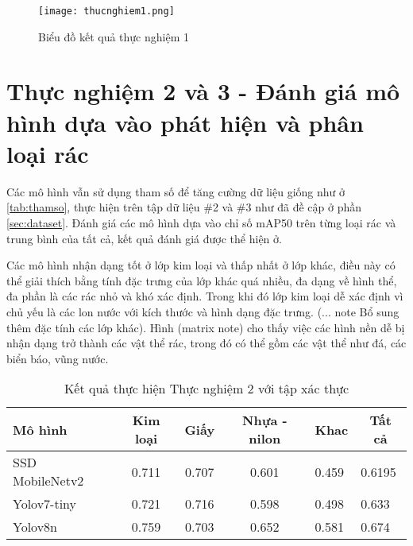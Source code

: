 \documentclass[../the.tex]{subfiles}
\begin{document}
\begin{figure}[H]
    \centering
    \texttt{[image: thucnghiem1.png]}
    \caption{Biểu đồ kết quả thực nghiệm 1}
    \label{fig:thucnghiem1}
\end{figure}

\bigskip

\section{Thực nghiệm 2 và 3 - Đánh giá mô hình dựa vào phát hiện và phân loại rác}
 {\fontsize{13}{12} \selectfont
  Các mô hình vẫn sử dụng tham số để tăng cường dữ liệu giống như ở \ref{tab:thamso}, thực hiện trên tập dữ liệu \#2 và \#3 như đã đề cập ở phần \ref{sec:dataset}.
  Đánh giá các mô hình dựa vào chỉ số mAP50 trên từng loại rác và trung bình của tất cả, kết quả đánh giá được thể hiện ở.
 }

\bigskip

{\fontsize{13}{12} \selectfont
    Các mô hình nhận dạng tốt ở lớp kim loại và thấp nhất ở lớp khác,
    điều này có thể giải thích bằng tính đặc trưng của lớp khác quá nhiều, đa dạng về hình thể, đa phần là các rác nhỏ và khó xác định.
    Trong khi đó lớp kim loại dễ xác định vì chủ yếu là các lon nước với kích thước và hình dạng đặc trưng. (... note Bổ sung thêm đặc tính các lớp khác).
    Hình (matrix note) cho thấy việc các hình nền dễ bị nhận dạng trở thành các vật thể rác, trong đó có thể gồm các vật thể như đá, các biển báo, vũng nước.
}
\begin{table}[h!]
    \centering
    \caption{Kết quả thực hiện Thực nghiệm 2 với tập xác thực}
    \begin{tabular}{|l|c|c|c|l|l|}
        \hline
        \textbf{Mô hình}  & \textbf{Kim loại}          & \textbf{Giấy}              & \textbf{Nhựa - nilon}      & \multicolumn{1}{c|}{\textbf{Khac}} & \multicolumn{1}{c|}{\textbf{Tất cả}} \\ \hline
        SSD   MobileNetv2 & 0.711                      & 0.707                      & 0.601                      & 0.459                              & 0.6195                               \\ \hline
        Yolov7-tiny       & 0.721                      & 0.716                      & 0.598                      & 0.498                              & 0.633                                \\ \hline
        Yolov8n           & 0.759                      & 0.703                      & 0.652                      & 0.581                              & 0.674                                \\ \hline
    \end{tabular}
    \label{tab:thucnghiem2.1}
\end{table}
\end{document}
